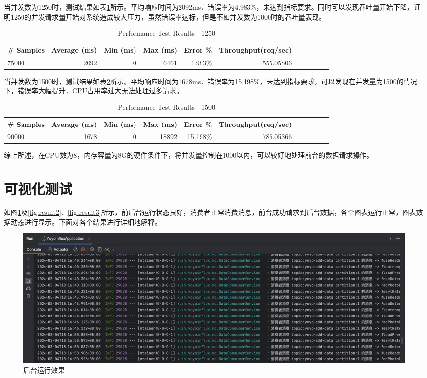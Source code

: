 \documentclass[oneside]{xduugthesis}
\begin{document}
当并发数为1250时，测试结果如表\ref{tab:performance-results-1250}所示。平均响应时间为2092ms，错误率为4.983\%，未达到指标要求。同时可以发现吞吐量开始下降，证明1250的并发请求量开始对系统造成较大压力，虽然错误率达标，但是不如并发数为1000时的吞吐量表现。

\begin{table}[htb]
\caption{Performance Test Results - 1250}
\centering
\begin{tabular}{lrrrrrrrrrr}\hline
\toprule
\textbf{\# Samples} & \textbf{Average (ms)} & \textbf{Min (ms)} & \textbf{Max (ms)} & \textbf{Error \%} & \textbf{Throughput(req/sec)} \\\hline
\midrule
75000&2092&0&6461&4.983\%&555.05806\\\hline
\bottomrule
\end{tabular}
\label{tab:performance-results-1250}
\end{table}

当并发数为1500时，测试结果如表\ref{tab:performance-results-1500}所示。平均响应时间为1678ms，错误率为15.198\%，未达到指标要求。可以发现在并发量为1500的情况下，错误率大幅提升，CPU占用率过大无法处理过多请求。

\begin{table}[htb!]
\caption{Performance Test Results - 1500}
\centering
\begin{tabular}{lrrrrrrrrrr}\hline
\toprule
\textbf{\# Samples} & \textbf{Average (ms)} & \textbf{Min (ms)} & \textbf{Max (ms)} & \textbf{Error \%} & \textbf{Throughput(req/sec)} \\\hline
\midrule
90000 & 1678 & 0 & 18892 & 15.198\% & 786.05366 \\\hline
\bottomrule
\end{tabular}
\label{tab:performance-results-1500}
\end{table}

综上所述，在CPU数为8，内存容量为8G的硬件条件下，将并发量控制在1000以内，可以较好地处理前台的数据请求操作。

\section{可视化测试}

如图\ref{fig:result1}及\ref{fig:result2}、\ref{fig:result3}所示，前后台运行状态良好，消费者正常消费消息，前台成功请求到后台数据，各个图表运行正常，图表数据动态进行显示。下面对各个结果进行详细地解释。

\begin{figure}[htb]
    \centering
    \includegraphics[width=0.8\linewidth]{images/result1.png}
    \caption{后台运行效果}
    \label{fig:result1}
\end{figure}
\end{document}
